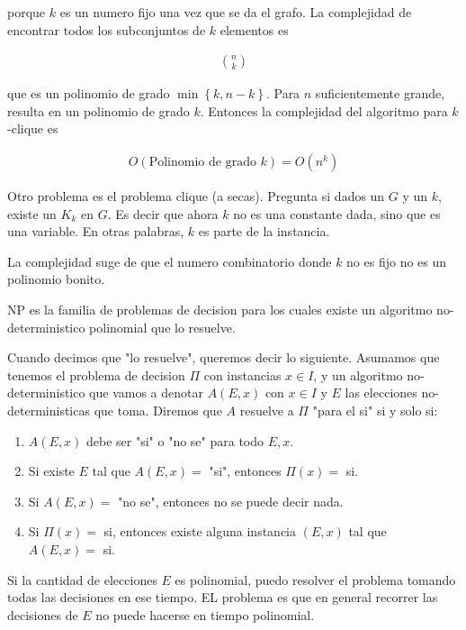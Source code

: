 \documentclass[a4paper]{article}
\begin{document}
porque $k$ es un numero fijo una vez que se da el grafo. La complejidad de encontrar 
todos los subconjuntos de $k$ elementos es 

\begin{align*}
     \binom{n}{k}
\end{align*}

que es un polinomio de grado $\min\left\{ k, n - k \right\} $. Para $n$
suficientemente grande, resulta en un polinomio de grado $k$.
Entonces la complejidad del algoritmo para $k$-clique es 

\begin{align*}
    O(\text{Polinomio de grado } k) = O(n^k)
\end{align*}

Otro problema es el problema clique (a secas). Pregunta si dados un $G$ y un $k$,
existe un $K_k$ en $G$. Es decir que ahora $k$ no es una constante dada, sino 
que es una variable. En otras palabras, $k$ es parte de la instancia.

La complejidad suge de que el numero combinatorio donde $k$ no es fijo no es un
polinomio bonito.

\begin{definition}
    NP es la familia de problemas de decision para los cuales existe 
    un algoritmo no-deterministico polinomial que lo resuelve.
\end{definition}

Cuando decimos que "lo resuelve", queremos decir lo siguiente. Asumamos que
tenemos el problema de decision $\Pi$ con instancias $x \in I$, y un algoritmo
no-deterministico que vamos a denotar $A(E, x)$ con $x \in I$ y $E$ las
elecciones no-deterministicas que toma. Diremos que $A$ resuelve a $\Pi$ "para
el si" si y solo si:

\begin{enumerate}
    \item $A(E, x)$ debe ser "si" o "no se" para todo $E, x$.
    \item Si existe $E$ tal que $A(E, x) = $ "si", entonces $\Pi(x) = $  si.
    \item Si $A(E, x) =$ "no se", entonces no se puede decir nada.
    \item Si $\Pi(x) = $ si, entonces existe alguna instancia $(E, x)$ tal que 
        $A(E, x) = $ si.
\end{enumerate}

Si la cantidad de elecciones $E$ es polinomial, puedo resolver el problema 
tomando todas las decisiones en ese tiempo. EL problema es que en general 
recorrer las decisiones de $E$ no puede hacerse en tiempo polinomial.
\end{document}
